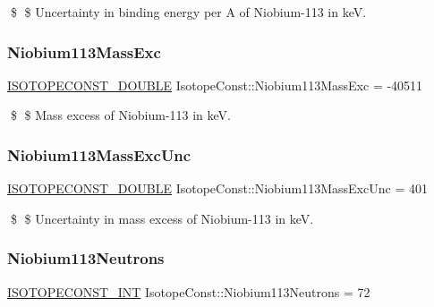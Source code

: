 \$ \$ Uncertainty in binding energy per A of Niobium-\/113 in keV. \mbox{\label{group___isotope_const-_niobium-_nb113_gab9591028c5cc898a9840b3323791326d}} 
\subsubsection{\texorpdfstring{Niobium113\+Mass\+Exc}{Niobium113MassExc}}
{\footnotesize\ttfamily \mbox{\hyperlink{group___isotope_const-_macros_ga8f45a7272ce02c0b4c65c44636ed719a}{I\+S\+O\+T\+O\+P\+E\+C\+O\+N\+S\+T\+\_\+\+D\+O\+U\+B\+LE}} Isotope\+Const\+::\+Niobium113\+Mass\+Exc = -\/40511}

\$ \$ Mass excess of Niobium-\/113 in keV. \mbox{\label{group___isotope_const-_niobium-_nb113_gac64015573bd5edd4ae197585b3d51e33}} 
\subsubsection{\texorpdfstring{Niobium113\+Mass\+Exc\+Unc}{Niobium113MassExcUnc}}
{\footnotesize\ttfamily \mbox{\hyperlink{group___isotope_const-_macros_ga8f45a7272ce02c0b4c65c44636ed719a}{I\+S\+O\+T\+O\+P\+E\+C\+O\+N\+S\+T\+\_\+\+D\+O\+U\+B\+LE}} Isotope\+Const\+::\+Niobium113\+Mass\+Exc\+Unc = 401}

\$ \$ Uncertainty in mass excess of Niobium-\/113 in keV. \mbox{\label{group___isotope_const-_niobium-_nb113_ga5322e770be1b10939fe8ea9e373ab884}} 
\subsubsection{\texorpdfstring{Niobium113\+Neutrons}{Niobium113Neutrons}}
{\footnotesize\ttfamily \mbox{\hyperlink{group___isotope_const-_macros_ga5f18360b3e99483a35c32d789e62621c}{I\+S\+O\+T\+O\+P\+E\+C\+O\+N\+S\+T\+\_\+\+I\+NT}} Isotope\+Const\+::\+Niobium113\+Neutrons = 72}

